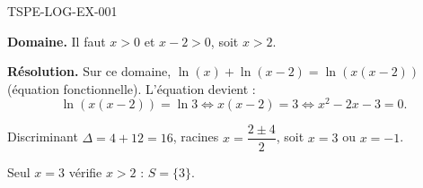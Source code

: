 \begin{corrige}{TSPE-LOG-EX-001}

\textbf{Domaine.} Il faut $x>0$ et $x-2>0$, soit $x>2$.

\textbf{Résolution.} Sur ce domaine, $\ln(x)+\ln(x-2) = \ln(x(x-2))$ (équation fonctionnelle). L'équation devient :
\[
  \ln(x(x-2)) = \ln 3 \iff x(x-2) = 3 \iff x^2 - 2x - 3 = 0.
\]

Discriminant $\Delta = 4+12=16$, racines $x = \dfrac{2 \pm 4}{2}$, soit $x=3$ ou $x=-1$.

Seul $x=3$ vérifie $x>2$ : $\boxed{S=\{3\}}$.

\end{corrige}
